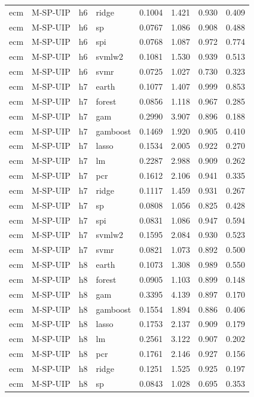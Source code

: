 \begin{ThreePartTable}
\begin{longtable}[t]{llclcccc}
ecm & M-SP-UIP & h6 & ridge & 0.1004 & 1.421 & 0.930 & 0.409\\
ecm & M-SP-UIP & h6 & sp & 0.0767 & 1.086 & 0.908 & 0.488\\
ecm & M-SP-UIP & h6 & spi & 0.0768 & 1.087 & 0.972 & 0.774\\
ecm & M-SP-UIP & h6 & svmlw2 & 0.1081 & 1.530 & 0.939 & 0.513\\
ecm & M-SP-UIP & h6 & svmr & 0.0725 & 1.027 & 0.730 & 0.323\\
\addlinespace
ecm & M-SP-UIP & h7 & earth & 0.1077 & 1.407 & 0.999 & 0.853\\
ecm & M-SP-UIP & h7 & forest & 0.0856 & 1.118 & 0.967 & 0.285\\
ecm & M-SP-UIP & h7 & gam & 0.2990 & 3.907 & 0.896 & 0.188\\
ecm & M-SP-UIP & h7 & gamboost & 0.1469 & 1.920 & 0.905 & 0.410\\
ecm & M-SP-UIP & h7 & lasso & 0.1534 & 2.005 & 0.922 & 0.270\\
ecm & M-SP-UIP & h7 & lm & 0.2287 & 2.988 & 0.909 & 0.262\\
ecm & M-SP-UIP & h7 & pcr & 0.1612 & 2.106 & 0.941 & 0.335\\
ecm & M-SP-UIP & h7 & ridge & 0.1117 & 1.459 & 0.931 & 0.267\\
ecm & M-SP-UIP & h7 & sp & 0.0808 & 1.056 & 0.825 & 0.428\\
ecm & M-SP-UIP & h7 & spi & 0.0831 & 1.086 & 0.947 & 0.594\\
ecm & M-SP-UIP & h7 & svmlw2 & 0.1595 & 2.084 & 0.930 & 0.523\\
ecm & M-SP-UIP & h7 & svmr & 0.0821 & 1.073 & 0.892 & 0.500\\
\addlinespace
ecm & M-SP-UIP & h8 & earth & 0.1073 & 1.308 & 0.989 & 0.550\\
ecm & M-SP-UIP & h8 & forest & 0.0905 & 1.103 & 0.899 & 0.148\\
ecm & M-SP-UIP & h8 & gam & 0.3395 & 4.139 & 0.897 & 0.170\\
ecm & M-SP-UIP & h8 & gamboost & 0.1554 & 1.894 & 0.886 & 0.406\\
ecm & M-SP-UIP & h8 & lasso & 0.1753 & 2.137 & 0.909 & 0.179\\
ecm & M-SP-UIP & h8 & lm & 0.2561 & 3.122 & 0.907 & 0.202\\
ecm & M-SP-UIP & h8 & pcr & 0.1761 & 2.146 & 0.927 & 0.156\\
ecm & M-SP-UIP & h8 & ridge & 0.1251 & 1.525 & 0.925 & 0.197\\
ecm & M-SP-UIP & h8 & sp & 0.0843 & 1.028 & 0.695 & 0.353\\

\end{longtable}
\end{ThreePartTable}
